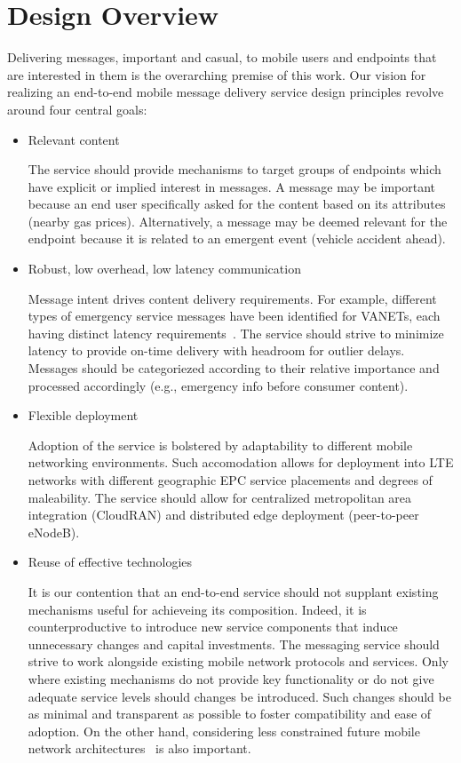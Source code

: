 \section{Design Overview}

Delivering messages, important and casual, to mobile users and
endpoints that are interested in them is the overarching premise of
this work. Our vision for realizing an end-to-end mobile message
delivery service design principles revolve around four central
goals:

\begin{itemize}
\item Relevant content

The service should provide mechanisms to target groups of endpoints
which have explicit or implied interest in messages. A message may be
important because an end user specifically asked for the content based
on its attributes (nearby gas prices). Alternatively, a message may be
deemed relevant for the endpoint because it is related to an emergent
event (vehicle accident ahead).

\item Robust, low overhead, low latency communication

Message intent drives content delivery requirements.  For example,
different types of emergency service messages have been identified for
VANETs, each having distinct latency
requirements~\cite{vanet-msg-reqs}. The service should strive to
minimize latency to provide on-time delivery with headroom for outlier
delays. Messages should be categoriezed according to their relative
importance and processed accordingly (e.g., emergency info before
consumer content).

\item Flexible deployment

Adoption of the service is bolstered by adaptability to different
mobile networking environments.  Such accomodation allows for
deployment into LTE networks with different geographic EPC service
placements and degrees of maleability.  The service should allow for
centralized metropolitan area integration (CloudRAN) and distributed
edge deployment (peer-to-peer eNodeB).

\item Reuse of effective technologies

It is our contention that an end-to-end service should not supplant
existing mechanisms useful for achieveing its composition.  Indeed, it
is counterproductive to introduce new service components that induce
unnecessary changes and capital investments. The messaging service
should strive to work alongside existing mobile network protocols and
services.  Only where existing mechanisms do not provide key
functionality or do not give adequate service levels should changes be
introduced.  Such changes should be as minimal and transparent as
possible to foster compatibility and ease of adoption. On the other
hand, considering less constrained future mobile network
architectures~\cite{5gvision,venkataramani2014mobility} is also
important.

\end{itemize}

